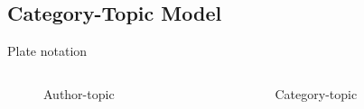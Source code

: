 \subsection{Category-Topic Model}
\begin{frame}{\insertsubsection}{Plate notation}
	\begin{columns}
		\begin{column}{0.45\textwidth}
			\begin{figure}
				\resizebox{\textwidth}{!}{%
					
				}
				\caption*{Author-topic}
			\end{figure}
		\end{column}
		\begin{column}{0.45\textwidth}
			\begin{figure}
				\resizebox{\textwidth}{!}{%
					
				}
				\caption*{Category-topic}
			\end{figure}
		\end{column}
	\end{columns}
\end{frame}